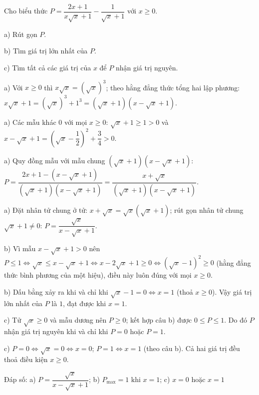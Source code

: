 \begin{problem}[9DS-CAN-020]
Cho biểu thức $P = \dfrac{2x + 1}{x\sqrt{x} + 1} - \dfrac{1}{\sqrt{x} + 1}$ với $x \geq 0$.

a) Rút gọn $P$.

b) Tìm giá trị lớn nhất của $P$.

c) Tìm tất cả các giá trị của $x$ để $P$ nhận giá trị nguyên.

\begin{solution}
a) Với $x \geq 0$ thì $x\sqrt{x} = (\sqrt{x})^3$; theo hằng đẳng thức tổng hai lập phương: $x\sqrt{x} + 1 = (\sqrt{x})^3 + 1^3 = (\sqrt{x} + 1)(x - \sqrt{x} + 1)$.

a) Các mẫu khác $0$ với mọi $x \geq 0$: $\sqrt{x} + 1 \geq 1 > 0$ và $x - \sqrt{x} + 1 = \left(\sqrt{x} - \dfrac{1}{2}\right)^2 + \dfrac{3}{4} > 0$.

a) Quy đồng mẫu với mẫu chung $(\sqrt{x} + 1)(x - \sqrt{x} + 1)$: $P = \dfrac{2x + 1 - (x - \sqrt{x} + 1)}{(\sqrt{x} + 1)(x - \sqrt{x} + 1)} = \dfrac{x + \sqrt{x}}{(\sqrt{x} + 1)(x - \sqrt{x} + 1)}$.

a) Đặt nhân tử chung ở tử: $x + \sqrt{x} = \sqrt{x}(\sqrt{x} + 1)$; rút gọn nhân tử chung $\sqrt{x} + 1 \neq 0$: $P = \dfrac{\sqrt{x}}{x - \sqrt{x} + 1}$.

b) Vì mẫu $x - \sqrt{x} + 1 > 0$ nên $P \leq 1 \Leftrightarrow \sqrt{x} \leq x - \sqrt{x} + 1 \Leftrightarrow x - 2\sqrt{x} + 1 \geq 0 \Leftrightarrow (\sqrt{x} - 1)^2 \geq 0$ (hằng đẳng thức bình phương của một hiệu), điều này luôn đúng với mọi $x \geq 0$.

b) Dấu bằng xảy ra khi và chỉ khi $\sqrt{x} - 1 = 0 \Leftrightarrow x = 1$ (thoả $x \geq 0$). Vậy giá trị lớn nhất của $P$ là $1$, đạt được khi $x = 1$.

c) Tử $\sqrt{x} \geq 0$ và mẫu dương nên $P \geq 0$; kết hợp câu b) được $0 \leq P \leq 1$. Do đó $P$ nhận giá trị nguyên khi và chỉ khi $P = 0$ hoặc $P = 1$.

c) $P = 0 \Leftrightarrow \sqrt{x} = 0 \Leftrightarrow x = 0$; $P = 1 \Leftrightarrow x = 1$ (theo câu b). Cả hai giá trị đều thoả điều kiện $x \geq 0$.

Đáp số: a) $\boxed{P = \dfrac{\sqrt{x}}{x - \sqrt{x} + 1}}$; b) $\boxed{P_{\max} = 1 \text{ khi } x = 1}$; c) $\boxed{x = 0 \text{ hoặc } x = 1}$
\end{solution}
\end{problem}

